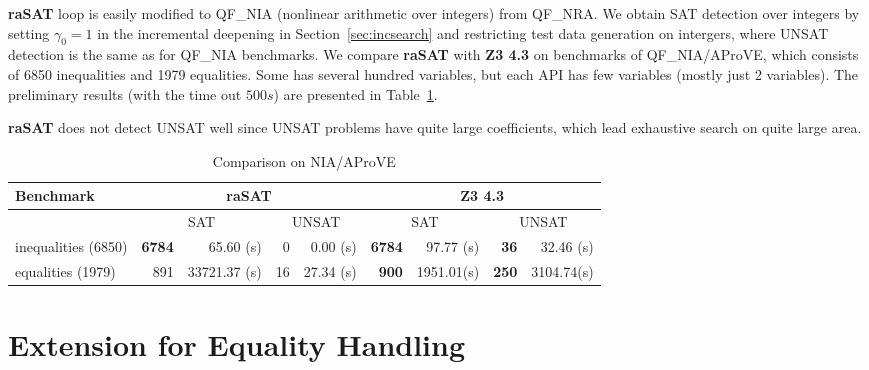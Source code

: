 \documentclass[runningheads,a4paper,oribibl]{llncs}
\newcommand{\suppress}[1]{} %
\begin{document}
{\bf raSAT} loop is easily modified to QF\_NIA (nonlinear arithmetic over
integers) from QF\_NRA.
We obtain SAT detection over integers by setting $\gamma_0 = 1$ in
the incremental deepening in Section~\ref{sec:incsearch} 
and restricting test data generation on intergers,
where UNSAT detection is the same as for QF\_NIA benchmarks. 
We compare {\bf raSAT} with {\bf Z3 4.3} on benchmarks of QF\_NIA/AProVE, 
which consists of 6850 inequalities and 1979 equalities. 
Some has several hundred variables, but each API has few variables
(mostly just 2 variables).
The preliminary results (with the time out $500s$) are presented in
Table~\ref{tab:aprove}. 
\suppress{
\begin{itemize}
\item {\bf raSAT} detects 6773 SAT in 90.22s, and 2 UNSAT in 378.04s. 
\item {\bf Z3 4.3} detects 6784 SAT in 97.70s, and 36 UNSAT in 32.08s. 
\end{itemize}
where the timeout is $500s$. 
}
{\bf raSAT} does not detect UNSAT well since UNSAT problems
have quite large coefficients, which lead exhaustive search on quite large area.
\begin{table}[t]
\centering
\begin{tabular}{ | l | r | r | r | r  | r | r | r | r |}
\hline
    \multicolumn{1}{|l|}{Benchmark} & 
    \multicolumn{4}{c|}{\bf raSAT} & \multicolumn{4}{c|}{\bf Z3 4.3}\\
\hline
    & \multicolumn{2}{c}{SAT} & \multicolumn{2}{|c}{UNSAT} 
    & \multicolumn{2}{|c}{SAT} & \multicolumn{2}{|c|}{UNSAT} \\
\hline
inequalities (6850) & \textbf{6784} & 65.60 (s) & 0 & 0.00 (s) &
\textbf{6784} & 97.77 (s) & \textbf{36} & 32.46 (s) 
\\
\hline
equalities (1979) & 891 & 33721.37 (s) & 16 & 27.34 (s) &
\textbf{900} & 1951.01(s) & \textbf{250} & 3104.74(s) 
\\
\hline
\end{tabular}
\medskip 
\caption{Comparison on NIA/AProVE} \label{tab:aprove}
\end{table}


\section{Extension for Equality Handling} \label{sec:eq}
\end{document}
